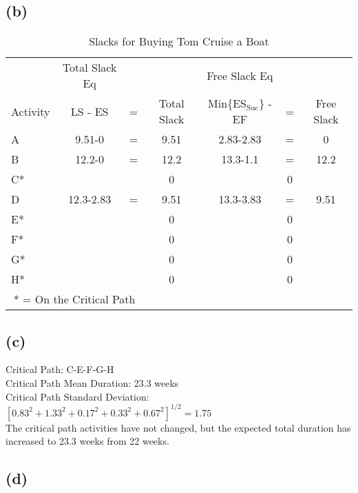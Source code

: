 \documentclass{article}
\begin{document}
	\begin{center}
	\makebox[\textwidth]{
		}
	\end{center}
	\subsection*{(b)}
	{\renewcommand{\arraystretch}{1.2} 
	\begin{table}[h!tbp]
  		\begin{center}
    		\caption{Slacks for Buying Tom Cruise a Boat}
    		\label{tab:table2}
			
    		\begin{tabular}{lcccccc}
				 & Total Slack Eq &  &  & Free Slack Eq & &\\
				Activity & LS - ES & = & Total Slack & Min\{ES$_{\text{Suc}}$\} - EF &= & Free Slack \\
				\hline
				\hline
      			A  & 9.51-0&= & 9.51 & 2.83-2.83&=& 0\\
      			B  & 12.2-0&= & 12.2 & 13.3-1.1&= & 12.2\\
				C* &       & &0 && 0\\
				D  & 12.3-2.83&= & 9.51 & 13.3-3.83&= & 9.51\\
				E* && &0 && 0\\
				F* && &0 && 0\\
				G* && &0 && 0\\
				H* && &0 && 0\\
				\hline
				\multicolumn{3}{c}{* = On the Critical Path}\\
    		\end{tabular}
  		\end{center}
	\end{table}
	}
	\subsection*{(c)}
	\noindent Critical Path: C-E-F-G-H\\
	Critical Path Mean Duration: 23.3 weeks\\
	Critical Path Standard Deviation: $[0.83^2 + 1.33^2 + 0.17^2 + 0.33^2 + 0.67^2]^{1/2} = 1.75$
	\\
	
	\noindent The critical path activities have not changed, but the expected total duration has increased to 23.3 weeks from 22 weeks. 
	\subsection*{(d)}
	
\end{document}

